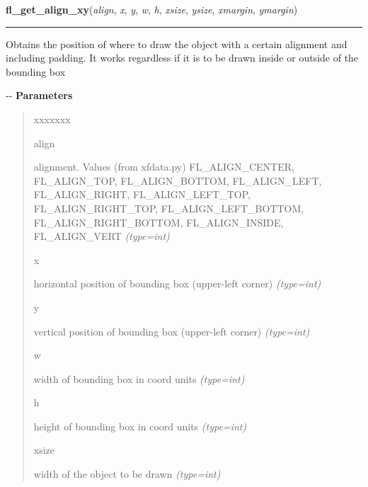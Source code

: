 \hspace{.8\funcindent}\begin{boxedminipage}{\funcwidth}

    \raggedright \textbf{fl\_get\_align\_xy}(\textit{align}, \textit{x}, \textit{y}, \textit{w}, \textit{h}, \textit{xsize}, \textit{ysize}, \textit{xmargin}, \textit{ymargin})

    \vspace{-1.5ex}

    \rule{\textwidth}{0.5\fboxrule}
\setlength{\parskip}{2ex}

Obtains the position of where to draw the object with a certain
alignment and including padding. It works regardless if it is to be drawn
inside or outside of the bounding box

-{}-
\setlength{\parskip}{1ex}
      \textbf{Parameters}
      \vspace{-1ex}

      \begin{quote}
        \begin{Ventry}{xxxxxxx}

          \item[align]


alignment. Values (from xfdata.py) FL\_ALIGN\_CENTER, FL\_ALIGN\_TOP,
FL\_ALIGN\_BOTTOM, FL\_ALIGN\_LEFT, FL\_ALIGN\_RIGHT, FL\_ALIGN\_LEFT\_TOP,
FL\_ALIGN\_RIGHT\_TOP, FL\_ALIGN\_LEFT\_BOTTOM, FL\_ALIGN\_RIGHT\_BOTTOM,
FL\_ALIGN\_INSIDE, FL\_ALIGN\_VERT
            {\it (type=int)}

          \item[x]


horizontal position of bounding box (upper-left corner)
            {\it (type=int)}

          \item[y]


vertical position of bounding box (upper-left corner)
            {\it (type=int)}

          \item[w]


width of bounding box in coord units
            {\it (type=int)}

          \item[h]


height of bounding box in coord units
            {\it (type=int)}

          \item[xsize]


width of the object to be drawn
            {\it (type=int)}


\end{Ventry}
\end{quote}
\end{boxedminipage}
